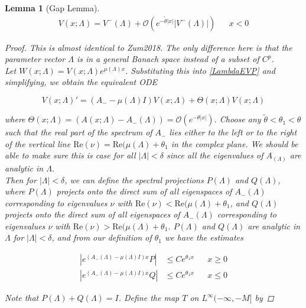\documentclass[12pt]{article}
\newtheorem{lemma}{Lemma}
\begin{document}
\begin{lemma}[Gap Lemma]
\begin{align}
V(x; \Lambda) = V^-(\Lambda) + \mathcal{O}(e^{-\tilde{\theta}|x|}|V^-(\Lambda)|) && x < 0
\end{align}

\begin{proof}
This is almost identical to Zum2018. The only difference here is that the parameter vector $\Lambda$ is in a general Banach space instead of a subset of $C^p$.\\

Let $W(x; \Lambda) = V(x; \Lambda) e^{\mu(\Lambda) x}$. Substituting this into \eqref{LambdaEVP} and simplifying, we obtain the equivalent ODE

\begin{equation}\label{VEVP}
V(x; \Lambda)' = (A_- - \mu(\Lambda)I)V(x; \Lambda) + \Theta(x; \Lambda) V(x; \Lambda)
\end{equation}

where $\Theta(x; \Lambda) = (A(x; \Lambda) - A_-(\Lambda)) = \mathcal{O}(e^{-\theta|x|})$. Choose any $\tilde{\theta} < \theta_1 < \theta$ such that the real part of the spectrum of $A_-$ lies either to the left or to the right of the vertical line $\text{Re}(\nu) = \text{Re}(\mu(\Lambda) + \theta_1$ in the complex plane. We should be able to make sure this is case for all $|\Lambda| < \delta$ since all the eigenvalues of $A_(\Lambda)$ are analytic in $\Lambda$.\\

Then for $|\Lambda| < \delta$, we can define the spectral projections $P(\Lambda)$ and $Q(\Lambda)$, where $P(\Lambda)$ projects onto the direct sum of all eigenspaces of $A_-(\Lambda)$ corresponding to eigenvalues $\nu$ with $\text{Re}(\nu) < \text{Re}(\mu(\Lambda) + \theta_1$, and $Q(\Lambda)$ projects onto the direct sum of all eigenspaces of $A_-(\Lambda)$ corresponding to eigenvalues $\nu$ with $\text{Re}(\nu) > \text{Re}(\mu(\Lambda) + \theta_1$. $P(\Lambda)$ and $Q(\Lambda)$ are analytic in $\Lambda$ for $|\Lambda| < \delta$, and from our definition of $\theta_1$ we have the estimates

\begin{align*}
\left|e^{(A_-(\Lambda) - \mu(\Lambda)I)x}P \right| &\leq C e^{\theta_1 x} && x \geq 0 \\
\left|e^{(A_-(\Lambda) - \mu(\Lambda)I)x}Q \right| &\leq C e^{\theta_1 x} && x \leq 0
\end{align*}

Note that $P(\Lambda) + Q(\Lambda) = I$. Define the map $T$ on $L^\infty(-\infty, -M]$ by


\end{proof}
\end{lemma}
\end{document}
